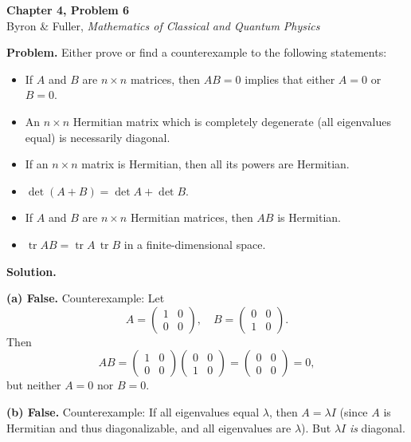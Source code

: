 \documentclass[12pt]{article}
\begin{document}
\begin{center}
{\Large\bfseries Chapter 4, Problem 6}\\[6pt]
Byron \& Fuller, \textit{Mathematics of Classical and Quantum Physics}
\end{center}

\bigskip

\textbf{Problem.} Either prove or find a counterexample to the following statements:
\begin{itemize}
\item[(a)] If $A$ and $B$ are $n \times n$ matrices, then $AB = 0$ implies that either $A = 0$ or $B = 0$.
\item[(b)] An $n \times n$ Hermitian matrix which is completely degenerate (all eigenvalues equal) is necessarily diagonal.
\item[(c)] If an $n \times n$ matrix is Hermitian, then all its powers are Hermitian.
\item[(d)] $\det(A + B) = \det A + \det B$.
\item[(e)] If $A$ and $B$ are $n \times n$ Hermitian matrices, then $AB$ is Hermitian.
\item[(f)] $\operatorname{tr} AB = \operatorname{tr} A \, \operatorname{tr} B$ in a finite-dimensional space.
\end{itemize}

\bigskip
\textbf{Solution.}

\textbf{(a) False.} Counterexample: Let
\[
A = \begin{pmatrix} 1 & 0 \\ 0 & 0 \end{pmatrix}, \quad B = \begin{pmatrix} 0 & 0 \\ 1 & 0 \end{pmatrix}.
\]
Then
\[
AB = \begin{pmatrix} 1 & 0 \\ 0 & 0 \end{pmatrix}\begin{pmatrix} 0 & 0 \\ 1 & 0 \end{pmatrix} = \begin{pmatrix} 0 & 0 \\ 0 & 0 \end{pmatrix} = 0,
\]
but neither $A = 0$ nor $B = 0$.

\bigskip
\textbf{(b) False.} Counterexample: If all eigenvalues equal $\lambda$, then $A = \lambda I$ (since $A$ is Hermitian and thus diagonalizable, and all eigenvalues are $\lambda$). But $\lambda I$ \emph{is} diagonal.
\end{document}
